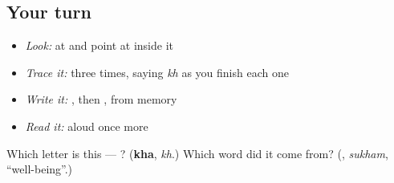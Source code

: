 \subsection*{Your turn}
\begin{itemize}
\raggedright
  \item \emph{Look:} at \textbf{} and point at  inside it
  \item \emph{Trace it:}  three times, saying \emph{kh} as you finish each one
  \item \emph{Write it:} , then , from memory
  \item \emph{Read it:} \textbf{} aloud once more
\end{itemize}

\begin{tcolorbox}[breakable,colback=teal!4,colframe=teal!35!black,title={Before you move on}]
Which letter is this — ? (\textbf{kha}, \emph{kh}.) Which word did it come from? (\textbf{}, \emph{sukham}, \textquotedblleft{}well-being\textquotedblright{}.)
\end{tcolorbox}
